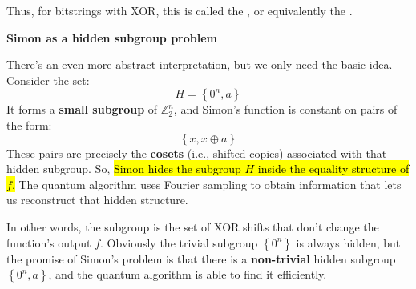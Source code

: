 \highspace
Thus, for bitstrings with XOR, this is called the , or equivalently the .

\highspace
\begin{flushleft}
    \textcolor{Green3}{ \textbf{Simon as a hidden subgroup problem}}
\end{flushleft}
There's an even more abstract interpretation, but we only need the basic idea. Consider the set:
\begin{equation*}
    H = \left\{
        0^{n}, a
    \right\}
\end{equation*}
It forms a \textbf{small subgroup} of $\mathbb{Z}_2^n$, and Simon's function is constant on pairs of the form:
\begin{equation*}
    \left\{
        x, x \oplus a
    \right\}
\end{equation*}
These pairs are precisely the \textbf{cosets} (i.e., shifted copies) associated with that hidden subgroup. So, \hl{Simon hides the subgroup $H$ inside the equality structure of $f$.} The quantum algorithm uses Fourier sampling to obtain information that lets us reconstruct that hidden structure.

\highspace
In other words, the subgroup is the set of XOR shifts that don't change the function's output $f$. Obviously the trivial subgroup $\left\{0^n\right\}$ is always hidden, but the promise of Simon's problem is that there is a \textbf{non-trivial} hidden subgroup $\left\{0^n, a\right\}$, and the quantum algorithm is able to find it efficiently.

